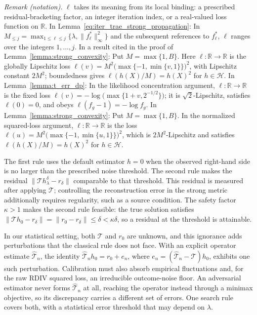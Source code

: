 \documentclass[12pt]{article}
\theoremstyle{plain}
\theoremstyle{definition}
\theoremstyle{remark}
\begin{document}
\noindent\textit{Remark (notation).} $\ell$ takes its meaning from its local binding: a prescribed residual-bracketing factor, an integer iteration index, or a real-valued loss function on $\mathbb R$. In Lemma~\ref{eq:iter_trae_strong_propagation}: In $M_{\leqslant j}=\max_{1\leqslant\ell\leqslant j}\{\lambda,\|f_\ell^*\|_\infty^2\}$ and the subsequent references to $f_\ell^*$, $\ell$ ranges over the integers $1,\ldots,j$. In a result cited in the proof of Lemma~\ref{lemma:strong_convexity}: Put $M=\max\{1,B\}$. Here $\ell:\mathbb R\to\mathbb R$ is the globally Lipschitz loss $\ell(v)=M^2\bigl(\max\{-1,\min\{v,1\}\}\bigr)^2$, with Lipschitz constant $2M^2$; boundedness gives $\ell(h(X)/M)=h(X)^2$ for $h\in\mathcal H$. In Lemma~\ref{lemma:t_err_dp}: In the likelihood concentration argument, $\ell:\mathbb R\to\mathbb R$ is the fixed loss $\ell(v)=-\log\bigl(\max\{1+v,2^{-1/2}\}\bigr)$; it is $\sqrt2$-Lipschitz, satisfies $\ell(0)=0$, and obeys $\ell(f_g-1)=-\log f_g$. In Lemma~\ref{lemma:strong_convexity}: Put $M=\max\{1,B\}$. In the normalized squared-loss argument, $\ell:\mathbb R\to\mathbb R$ is the loss $\ell(u)=M^2\bigl(\max\{-1,\min\{u,1\}\}\bigr)^2$, which is $2M^2$-Lipschitz and satisfies $\ell(h(X)/M)=h(X)^2$ for $h\in\mathcal H$.

The first rule uses the default estimator $h=0$ when the observed right-hand side is no larger than the prescribed noise threshold. The second rule makes the residual $\|\mathcal T h_\lambda^\delta-r_\delta\|$ comparable to that threshold. This residual is measured after applying $\mathcal T$; controlling the reconstruction error in the strong metric additionally requires regularity, such as a source condition. The safety factor $\kappa>1$ makes the second rule feasible: the true solution satisfies $\|\mathcal T h_0-r_\delta\|=\|r_0-r_\delta\|\leqslant\delta<\kappa\delta$, so a residual at the threshold is attainable.

In our statistical setting, both $\mathcal T$ and $r_0$ are unknown, and this ignorance adds perturbations that the classical rule does not face. With an explicit operator estimate $\hat{\mathcal T}_n$, the identity $\hat{\mathcal T}_n h_0=r_0+e_n$, where $e_n=(\hat{\mathcal T}_n-\mathcal T)h_0$, exhibits one such perturbation. Calibration must also absorb empirical fluctuations and, for the raw RDIV squared loss, an irreducible outcome-noise floor. An adversarial estimator never forms $\hat{\mathcal T}_n$ at all, reaching the operator instead through a minimax objective, so its discrepancy carries a different set of errors. One search rule covers both, with a statistical error threshold that may depend on $\lambda$.
\end{document}
